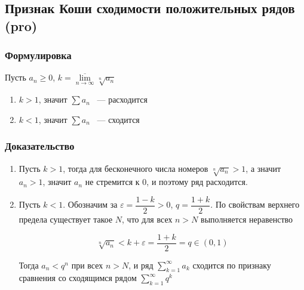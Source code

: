 \documentclass[../main.tex]{subfiles}
\begin{document}
\subsection{Признак Коши сходимости положительных рядов (pro)}
    \subsubsection*{Формулировка}
        
            Пусть $a_n \geq 0$, $k = \overline{\lim\limits_{n \rightarrow \infty}} \sqrt[n]{a_n}$
            
            \begin{enumerate}
            
                \item $k > 1$, значит $\sum a_n$ ~--- расходится
                
                \item $k < 1$, значит $\sum a_n$ ~--- сходится
                
            \end{enumerate}
            
        \subsubsection*{Доказательство}
        
            \begin{enumerate}
            
                \item Пусть $k > 1$, тогда для бесконечного числа номеров $\sqrt[n]{a_n} > 1$, а значит $a_n > 1$, значит $a_n$ не стремится к $0$, и поэтому ряд расходится.
                
                \item Пусть $k < 1$. Обозначим за $\varepsilon = \dfrac{1 - k}{2} > 0$, $q = \dfrac{1 + k}{2}$. По свойствам верхнего предела существует такое $N$, что для всех $n > N$ выполняется неравенство 
                
                    $$\sqrt[n]{a_n} < k + \varepsilon = \dfrac{1 + k}{2} = q \in (0, 1)$$
                    
                    Тогда $a_n < q^n$ при всех $n > N$, и ряд $\sum\limits^{\infty}_{k = 1} a_k$ сходится по признаку сравнения со сходящимся рядом $\sum\limits^{\infty}_{k = 1} q^k$
                
            \end{enumerate}
\newpage
\end{document}
